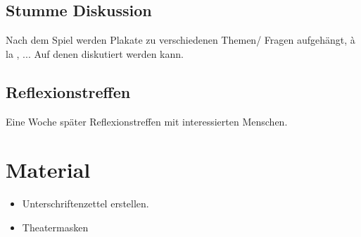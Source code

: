 \documentclass[12pt, a4paper, openany]{report}
\begin{document}
\section{Stumme Diskussion}
Nach dem Spiel werden Plakate zu verschiedenen Themen/ Fragen aufgehängt, à la , ... Auf denen  diskutiert werden kann.

\section{Reflexionstreffen}
Eine Woche später Reflexionstreffen mit interessierten Menschen.

\chapter{Material}
\begin{itemize}
    \item Unterschriftenzettel erstellen.
    \item Theatermasken
\end{itemize}

\printbibliography
\listoftodos
\end{document}
